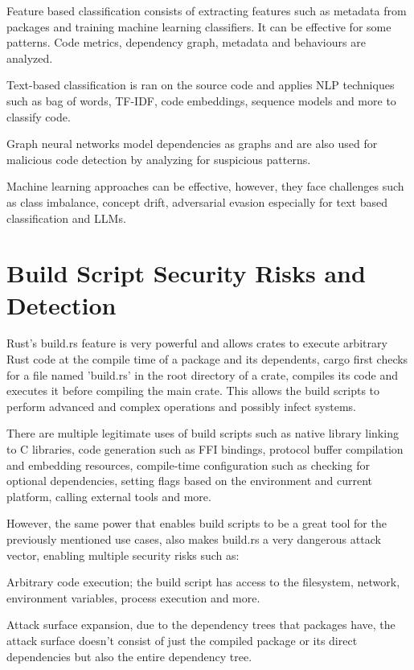 Feature based classification consists of extracting features such as metadata from packages and training machine learning classifiers. It can be effective for some patterns. Code metrics, dependency graph, metadata and behaviours are analyzed.

Text-based classification is ran on the source code and applies NLP techniques such as bag of words, TF-IDF, code embeddings, sequence models and more to classify code.

Graph neural networks model dependencies as graphs and are also used for malicious code detection by analyzing for suspicious patterns.

Machine learning approaches can be effective, however, they face challenges such as class imbalance, concept drift, adversarial evasion especially for text based classification and LLMs.

\section{Build Script Security Risks and Detection}\label{sect:build-script-security}

Rust's build.rs feature is very powerful and allows crates to execute arbitrary Rust code at the compile time of a package and its dependents, cargo first checks for a file named 'build.rs' in the root directory of a crate, compiles its code and executes it before compiling the main crate. This allows the build scripts to perform advanced and complex operations and possibly infect systems.

There are multiple legitimate uses of build scripts such as native library linking to C libraries, code generation such as FFI bindings, protocol buffer compilation and embedding resources, compile-time configuration such as checking for optional dependencies, setting flags based on the environment and current platform, calling external tools and more.

However, the same power that enables build scripts to be a great tool for the previously mentioned use cases, also makes build.rs a very dangerous attack vector, enabling multiple security risks such as:

Arbitrary code execution; the build script has access to the filesystem, network, environment variables, process execution and more.

Attack surface expansion, due to the dependency trees that packages have, the attack surface doesn't consist of just the compiled package or its direct dependencies but also the entire dependency tree.

